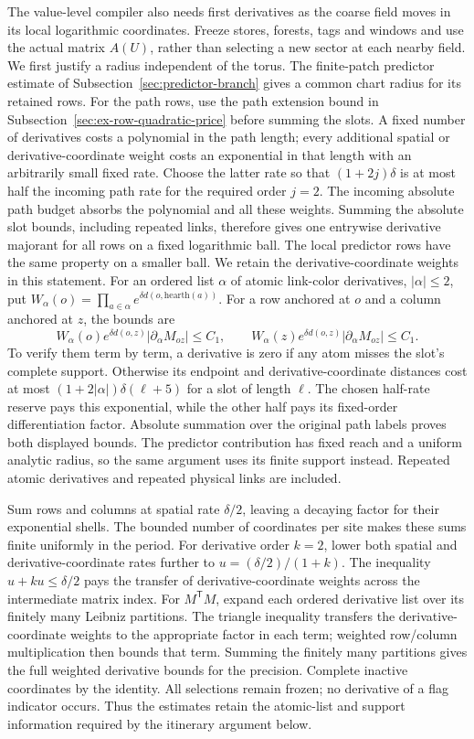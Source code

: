 The value-level compiler also needs first derivatives as the coarse field
moves in its local logarithmic coordinates. Freeze stores, forests, tags
and windows and use the actual matrix $A(U)$, rather than selecting a new
sector at each nearby field. We first justify a radius independent of the torus. The finite-patch
predictor estimate of Subsection~\ref{sec:predictor-branch} gives a common
chart radius for its retained rows. For the path rows, use the path
extension bound in Subsection~\ref{sec:ex-row-quadratic-price} before summing
the slots. A fixed number of derivatives costs a polynomial in the path
length; every additional spatial or derivative-coordinate weight costs
an exponential in that length with an arbitrarily small fixed rate.
Choose the latter rate so that $(1+2j)\delta$ is at most half the
incoming path rate for the required order $j=2$. The incoming absolute
path budget absorbs the polynomial and all these weights. Summing the
absolute slot bounds, including repeated links, therefore gives one
entrywise derivative majorant for all rows on a fixed logarithmic ball.
The local predictor rows have the same property on a smaller ball.
We retain the derivative-coordinate weights in this statement. For an
ordered list $\alpha$ of atomic link-color derivatives, $|\alpha|\leq2$,
put $W_\alpha(o)=\prod_{a\in\alpha}e^{\delta d(o,\mathrm{hearth}(a))}$.
For a row anchored at $o$ and a column anchored at $z$, the bounds are
\[
 W_\alpha(o)e^{\delta d(o,z)}
            |\partial_\alpha M_{oz}|\leq C_1,\qquad
 W_\alpha(z)e^{\delta d(o,z)}
            |\partial_\alpha M_{oz}|\leq C_1.
\]
To verify them term by term, a derivative is zero if any atom misses the
slot's complete support. Otherwise its endpoint and derivative-coordinate
distances cost at most $(1+2|\alpha|)\delta(\ell+5)$ for a slot of
length $\ell$. The chosen half-rate reserve pays this exponential, while
the other half pays its fixed-order differentiation factor. Absolute
summation over the original path labels proves both displayed bounds.
The predictor contribution has fixed reach and a uniform analytic
radius, so the same argument uses its finite support instead. Repeated
atomic derivatives and repeated physical links are included.

Sum rows and columns at spatial rate $\delta/2$, leaving a decaying
factor for their exponential shells. The bounded number of coordinates
per site makes these sums finite uniformly in the period. For derivative
order $k=2$, lower both spatial and derivative-coordinate rates further
to $u=(\delta/2)/(1+k)$. The inequality $u+ku\leq\delta/2$ pays the
transfer of derivative-coordinate weights across the intermediate matrix
index. For $M^{\mathsf T}M$, expand each
ordered derivative list over its finitely many Leibniz partitions. The
triangle inequality transfers the derivative-coordinate weights to the
appropriate factor in each term; weighted row/column multiplication then
bounds that term. Summing the finitely many partitions gives the full
weighted derivative bounds for the precision. Complete inactive
coordinates by the identity. All selections remain frozen; no derivative
of a flag indicator occurs. Thus the estimates retain the atomic-list
and support information required by the itinerary argument below.

